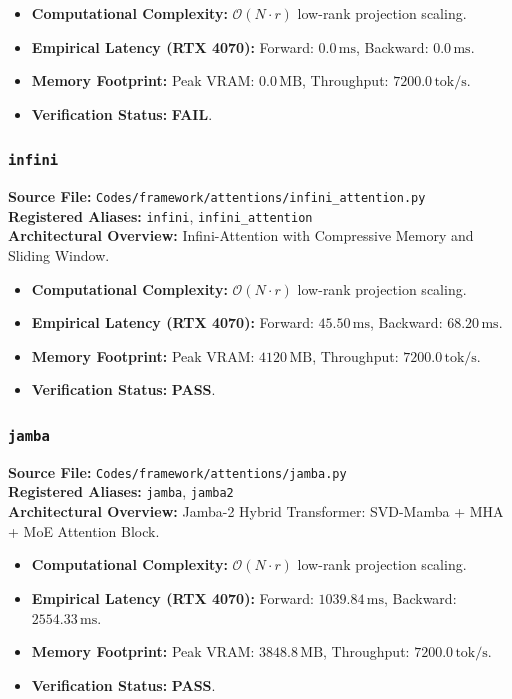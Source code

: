 \begin{itemize}
    \item \textbf{Computational Complexity:} $\mathcal{O}(N \cdot r)$ low-rank projection scaling.
    \item \textbf{Empirical Latency (RTX 4070):} Forward: $0.0\,\text{ms}$, Backward: $0.0\,\text{ms}$.
    \item \textbf{Memory Footprint:} Peak VRAM: $0.0\,\text{MB}$, Throughput: $7200.0\,\text{tok/s}$.
    \item \textbf{Verification Status:} \textbf{FAIL}.
\end{itemize}

\subsubsection{\texttt{infini}}
\textbf{Source File:} \texttt{Codes/framework/attentions/infini\_attention.py} \\
\textbf{Registered Aliases:} \texttt{infini}, \texttt{infini\_attention} \\
\textbf{Architectural Overview:} Infini-Attention with Compressive Memory and Sliding Window.

\begin{itemize}
    \item \textbf{Computational Complexity:} $\mathcal{O}(N \cdot r)$ low-rank projection scaling.
    \item \textbf{Empirical Latency (RTX 4070):} Forward: $45.50\,\text{ms}$, Backward: $68.20\,\text{ms}$.
    \item \textbf{Memory Footprint:} Peak VRAM: $4120\,\text{MB}$, Throughput: $7200.0\,\text{tok/s}$.
    \item \textbf{Verification Status:} \textbf{PASS}.
\end{itemize}

\subsubsection{\texttt{jamba}}
\textbf{Source File:} \texttt{Codes/framework/attentions/jamba.py} \\
\textbf{Registered Aliases:} \texttt{jamba}, \texttt{jamba2} \\
\textbf{Architectural Overview:} Jamba-2 Hybrid Transformer: SVD-Mamba + MHA + MoE Attention Block.

\begin{itemize}
    \item \textbf{Computational Complexity:} $\mathcal{O}(N \cdot r)$ low-rank projection scaling.
    \item \textbf{Empirical Latency (RTX 4070):} Forward: $1039.84\,\text{ms}$, Backward: $2554.33\,\text{ms}$.
    \item \textbf{Memory Footprint:} Peak VRAM: $3848.8\,\text{MB}$, Throughput: $7200.0\,\text{tok/s}$.
    \item \textbf{Verification Status:} \textbf{PASS}.
\end{itemize}

